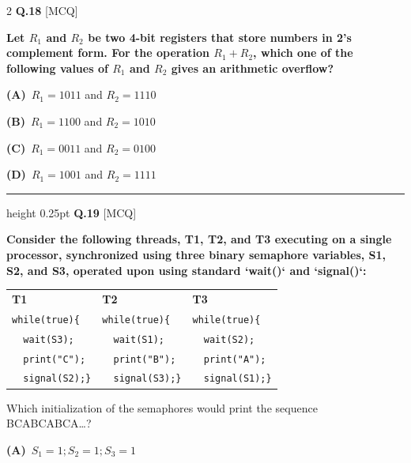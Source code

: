 \documentclass[a4paper,10pt,twoside]{article}
\begin{document}
\begin{multicols}{2}
\noindent\textbf{Q.18} \hfill {\footnotesize\textsf{[MCQ]}}
\par\vspace{2pt}
{\bfseries Let $R_1$ and $R_2$ be two 4-bit registers that store numbers in 2's complement form. For the operation $R_1 + R_2$, which one of the following values of $R_1$ and $R_2$ gives an arithmetic overflow? \par}
\par\vspace{2pt}\noindent
\textbf{(A)}~$R_1 = 1011$ and $R_2 = 1110$\par\vspace{2pt}\noindent
\textbf{(B)}~$R_1 = 1100$ and $R_2 = 1010$\par\vspace{2pt}\noindent
\textbf{(C)}~$R_1 = 0011$ and $R_2 = 0100$\par\vspace{2pt}\noindent
\textbf{(D)}~$R_1 = 1001$ and $R_2 = 1111$
\par\vspace{6pt}\hrule height 0.25pt\vspace{6pt}
\noindent\textbf{Q.19} \hfill {\footnotesize\textsf{[MCQ]}}
\par\vspace{2pt}
{\bfseries Consider the following threads, T1, T2, and T3 executing on a single processor, synchronized using three binary semaphore variables, S1, S2, and S3, operated upon using standard `wait()` and `signal()`:
\begin{center}
\begin{tabular}{p{3.5cm}p{3.5cm}p{3.5cm}}
\textbf{T1} & \textbf{T2} & \textbf{T3} \\
\texttt{while(true)\{} & \texttt{while(true)\{} & \texttt{while(true)\{} \\
\texttt{\ \ wait(S3);} & \texttt{\ \ wait(S1);} & \texttt{\ \ wait(S2);} \\
\texttt{\ \ print("C");} & \texttt{\ \ print("B");} & \texttt{\ \ print("A");} \\
\texttt{\ \ signal(S2);\}} & \texttt{\ \ signal(S3);\}} & \texttt{\ \ signal(S1);\}}
\end{tabular}
\end{center}
Which initialization of the semaphores would print the sequence BCABCABCA\dots? \par}
\par\vspace{2pt}\noindent
\textbf{(A)}~$S_1 = 1; S_2 = 1; S_3 = 1$\par\vspace{2pt}\noindent

\end{multicols}
\end{document}
